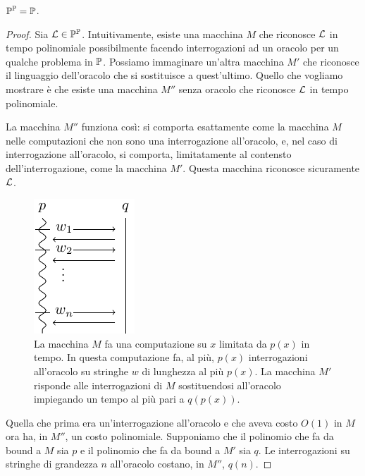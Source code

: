 \begin{thm}\label{thm:PPP}
    $\mathbb{P}^{\mathbb{P}} = \mathbb{P}$.
\end{thm}
\begin{proof}

    Sia $\mathcal{L} \in \mathbb{P}^{\mathbb{P}}$. Intuitivamente, esiste una macchina $M$ che riconosce $\mathcal{L}$
    in tempo polinomiale possibilmente facendo interrogazioni ad un oracolo per un qualche problema
    in $\mathbb{P}$. Possiamo immaginare un'altra macchina $M'$ che riconosce il linguaggio
    dell'oracolo che si sostituisce a quest'ultimo. Quello che vogliamo mostrare è che esiste una
    macchina $M''$ senza oracolo che riconosce $\mathcal{L}$ in tempo polinomiale.

    La macchina $M''$ funziona così: si comporta esattamente come la macchina $M$ nelle
    computazioni che non sono una interrogazione all'oracolo, e, nel caso di interrogazione
    all'oracolo, si comporta, limitatamente al contensto dell'interrogazione, come la macchina $M'$.
    Questa macchina riconosce sicuramente $\mathcal{L}$.

    \begin{figure}[h]
        \begin{center}
            \includegraphics{./img/oracles/PPP.pdf}
            \caption{La macchina $M$ fa una computazione su $x$ limitata da $p(x)$ in tempo. In questa
            computazione fa, al più, $p(x)$ interrogazioni all'oracolo su stringhe $w$ di lunghezza
        al più $p(x)$. La macchina $M'$ risponde alle interrogazioni di $M$ sostituendosi
    all'oracolo impiegando un tempo al più pari a $q(p(x))$.}
        \end{center}
    \end{figure}

    Quella che prima era un'interrogazione all'oracolo e che aveva costo $O(1)$ in $M$ ora ha, in
    $M''$, un costo polinomiale. Supponiamo che il polinomio che fa da bound a $M$ sia $p$ e il
    polinomio che fa da bound a $M'$ sia $q$. Le interrogazioni su stringhe di grandezza $n$
    all'oracolo costano, in $M''$, $q(n)$.
    

\end{proof}
